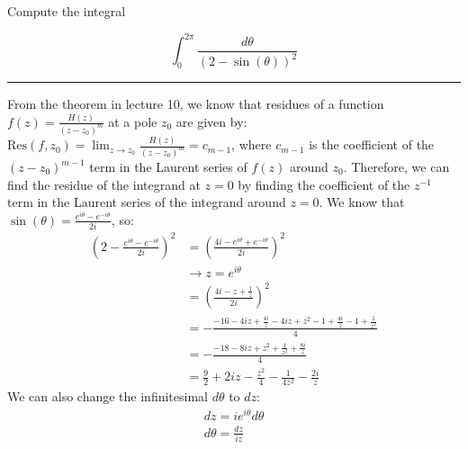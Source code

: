 \begin{example}

    Compute the integral

    $$\int_0^{2\pi}\frac{d\theta}{(2-\sin(\theta))^2}$$

    \hrule
    \vspace{0.5cm}
    From the theorem in lecture 10, we know that residues of a function $f(z) = \frac{H(z)}{(z - z_0)^m}$ at a pole $z_0$ are given by: $\text{Res}(f, z_0) = \lim_{z \to z_0} \frac{H(z)}{(z - z_0)^m} = c_{m-1}$, where $c_{m-1}$ is the coefficient of the $(z - z_0)^{m-1}$ term in the Laurent series of $f(z)$ around $z_0$. Therefore, we can find the residue of the integrand at $z=0$ by finding the coefficient of the $z^{-1}$ term in the Laurent series of the integrand around $z=0$.
    We know that $\sin(\theta)=\frac{e^{i\theta}-e^{-i\theta}}{2i}$, so:
    \begin{align*}
        (2 - \frac{e^{i\theta}-e^{-i\theta}}{2i})^2 & = (\frac{4i - e^{i\theta} + e^{-i\theta}}{2i})^2                                         \\
                                                    & \rightarrow z = e^{i\theta}                                                              \\
                                                    & = (\frac{4i - z + \frac{1}{z}}{2i} )^2                                                   \\
                                                    & = -\frac{-16 - 4iz + \frac{4i}{z} - 4iz + z^2 - 1 + \frac{4i}{z} - 1 + \frac{1}{z^2}}{4} \\
                                                    & = -\frac{-18 - 8iz + z^2 + \frac{1}{z^2} + \frac{8i}{z}}{4}                              \\
                                                    & = \frac{9}{2} +2iz - \frac{z^2}{4} - \frac{1}{4z^2} - \frac{2i}{z}
    \end{align*}
    We can also change the infinitesimal $d\theta$ to $dz$:
    \begin{align*}
        dz = i e^{i\theta} d\theta \\
        d\theta = \frac{dz}{iz}
    \end{align*}


\end{example}
